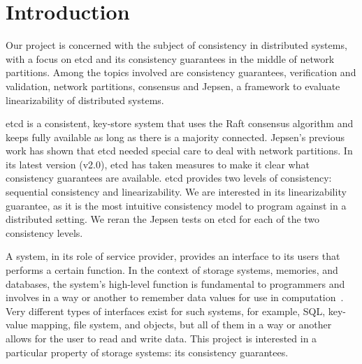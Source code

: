 \documentclass[12pt,conference]{IEEEtran}
\begin{document}




%
\IEEEpeerreviewmaketitle



\section{Introduction}

Our project is concerned with the subject of consistency in distributed systems, with a focus on etcd and its consistency guarantees in the middle of network partitions. Among the topics involved are consistency guarantees, verification and validation, network partitions, consensus and Jepsen, a framework to evaluate linearizability of distributed systems.

etcd is a consistent, key-store system that uses the Raft consensus algorithm and keeps fully available as long as there is a majority connected. Jepsen’s previous work has shown that etcd needed special care to deal with network partitions. In its latest version (v2.0), etcd has taken measures to make it clear what consistency guarantees are available. etcd provides two levels of consistency: sequential consistency and linearizability. We are interested in its linearizability guarantee, as it is the most intuitive consistency model to program against in a distributed setting. We reran the Jepsen tests on etcd for each of the two consistency levels.

A system, in its role of service provider, provides an interface to its users that performs a certain function. In the context of storage systems, memories, and databases, the system's high-level function is fundamental to programmers and involves in a way or another to remember data values for use in computation~\cite{saltzer2009principles}. Very different types of interfaces exist for such systems, for example, SQL, key-value mapping, file system, and objects, but all of them in a way or another allows for the user to read and write data. This project is interested in a particular property of storage systems: its consistency guarantees.
\end{document}
